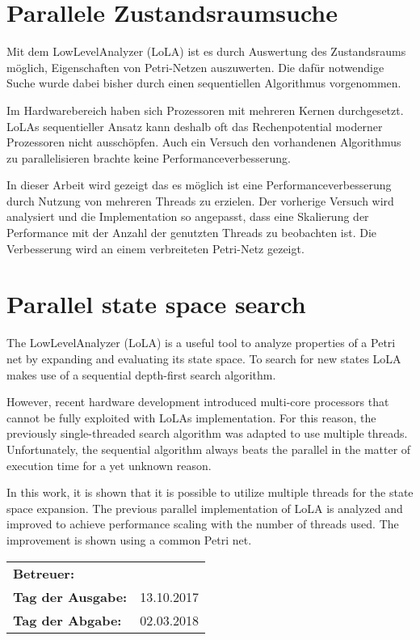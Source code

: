 \section*{Parallele Zustandsraumsuche}
Mit dem LowLevelAnalyzer (LoLA) ist es durch Auswertung des Zustandsraums möglich, Eigenschaften von Petri-Netzen auszuwerten. Die dafür notwendige Suche wurde dabei bisher durch einen sequentiellen Algorithmus vorgenommen.

Im Hardwarebereich haben sich Prozessoren mit mehreren Kernen durchgesetzt. LoLAs sequentieller Ansatz kann deshalb oft das Rechenpotential moderner Prozessoren nicht ausschöpfen. Auch ein Versuch den vorhandenen Algorithmus zu parallelisieren brachte keine Performanceverbesserung.

In dieser Arbeit wird gezeigt das es möglich ist eine Performanceverbesserung durch Nutzung von mehreren Threads zu erzielen. Der vorherige Versuch wird analysiert und die Implementation so angepasst, dass eine Skalierung der Performance mit der Anzahl der genutzten Threads zu beobachten ist. Die Verbesserung wird an einem verbreiteten Petri-Netz gezeigt.

\section*{Parallel state space search}
The LowLevelAnalyzer (LoLA) is a useful tool to analyze properties of a Petri net by expanding and evaluating its state space. To search for new states LoLA makes use of a sequential depth-first search algorithm.

However, recent hardware development introduced multi-core processors that cannot be fully exploited with LoLAs implementation. For this reason, the previously single-threaded search algorithm was adapted to use multiple threads. Unfortunately, the sequential algorithm always beats the parallel in the matter of execution time for a yet unknown reason.

In this work, it is shown that it is possible to utilize multiple threads for the state space expansion. The previous parallel implementation of LoLA is analyzed and improved to achieve performance scaling with the number of threads used. The improvement is shown using a common Petri net.


\vfill

\begin{tabular}{ll}
	\bfseries Betreuer: & \parbox[t]{10cm}{\betreuer }\vspace{5mm} \\
	\bfseries Tag der Ausgabe: & 13.10.2017 \\
	\bfseries Tag der Abgabe: & 02.03.2018 \\
\end{tabular}

